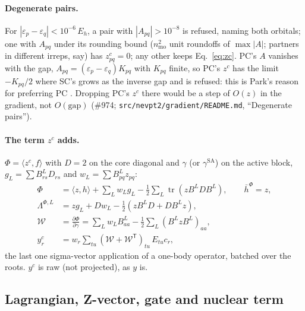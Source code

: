 \documentclass[11pt]{article}
\newcommand{\code}[1]{\texttt{#1}}
\newcommand{\eps}{\varepsilon}
\newcommand{\hb}{\bar h}
\newcommand{\Lb}{\Lambda}
\newcommand{\T}{\mathsf T}
\newcommand{\tr}{\operatorname{tr}}
\begin{document}
\paragraph{Degenerate pairs.} For $|\eps_p - \eps_q| < 10^{-6}\,E_h$, a pair
with $|A_{pq}| > 10^{-8}$ is refused, naming both orbitals; one with $A_{pq}$
under its rounding bound ($n_{\mathrm{mo}}^2$ unit roundoffs of $\max|A|$;
partners in different irreps, say) has $z^c_{pq} = 0$; any other keeps
Eq.~\eqref{eq:zc}. PC's $A$ vanishes with the gap,
$A_{pq} = (\eps_p - \eps_q) K_{pq}$ with $K_{pq}$ finite, so PC's $z^c$ has
the limit $-K_{pq}/2$ where SC's grows as the inverse gap and is refused:
this is Park's reason for preferring PC \cite{park2019}. Dropping PC's $z^c$
there would be a step of $O(z)$ in the gradient, not $O(\text{gap})$
(\#974; \code{src/nevpt2/gradient/README.md}, ``Degenerate pairs'').

\paragraph{The term $z^c$ adds.} $\Phi = \langle z^c, f\rangle$ with $D = 2$ on
the core diagonal and $\gamma$ (or $\gamma^{\mathrm{SA}}$) on the active
block, $g_L = \sum B^L_{rs}D_{rs}$ and $w_L = \sum B^L_{pq}z_{pq}$:
\begin{align}
  \Phi &= \langle z, h\rangle + \sum_L w_L g_L - \tfrac12\sum_L\tr(zB^LDB^L),\qquad
  \hb^\Phi = z,\\
  \Lb^{\Phi,L} &= z g_L + D w_L - \tfrac12(zB^LD + DB^Lz),\\
  \mathcal W &= \frac{\partial\Phi}{\partial\gamma} = \sum_L w_L B^L_{aa} - \tfrac12\sum_L(B^LzB^L)_{aa},\\
  y^c_r & = w_r\sum_{tu}(\mathcal W + \mathcal W^\T)_{tu}\,E_{tu}c_r,
\end{align}
the last one sigma-vector application of a one-body operator, batched over
the roots. $y^c$ is raw (not projected), as $y$ is.

\subsection{Lagrangian, Z-vector, gate and nuclear term}
\end{document}
